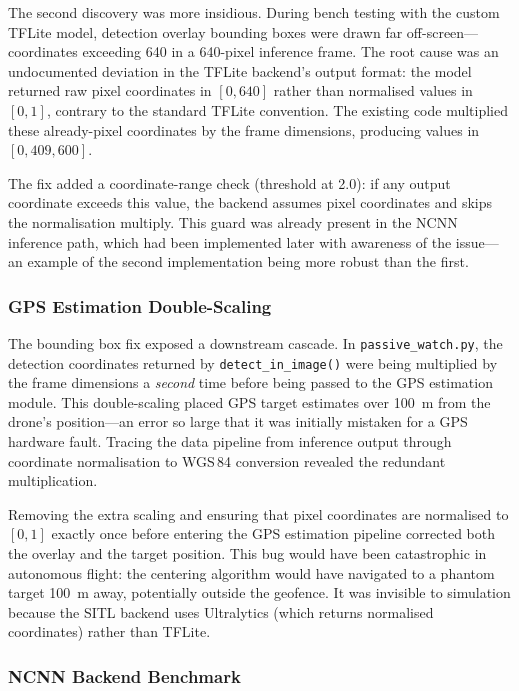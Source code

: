 The second discovery was more insidious.  During bench testing with the custom TFLite model, detection overlay bounding boxes were drawn far off-screen---coordinates exceeding 640 in a 640-pixel inference frame.  The root cause was an undocumented deviation in the TFLite backend's output format: the model returned raw pixel coordinates in $[0, 640]$ rather than normalised values in $[0, 1]$, contrary to the standard TFLite convention.  The existing code multiplied these already-pixel coordinates by the frame dimensions, producing values in $[0, 409{,}600]$.

The fix added a coordinate-range check (threshold at 2.0): if any output coordinate exceeds this value, the backend assumes pixel coordinates and skips the normalisation multiply.  This guard was already present in the NCNN inference path, which had been implemented later with awareness of the issue---an example of the second implementation being more robust than the first.

\subsubsection{GPS Estimation Double-Scaling}\label{sec:field-double}

The bounding box fix exposed a downstream cascade.  In \texttt{passive\_watch.py}, the detection coordinates returned by \texttt{detect\_in\_image()} were being multiplied by the frame dimensions a \emph{second} time before being passed to the GPS estimation module.  This double-scaling placed GPS target estimates over \SI{100}{\metre} from the drone's position---an error so large that it was initially mistaken for a GPS hardware fault.  Tracing the data pipeline from inference output through coordinate normalisation to WGS\,84 conversion revealed the redundant multiplication.

Removing the extra scaling and ensuring that pixel coordinates are normalised to $[0, 1]$ exactly once before entering the GPS estimation pipeline corrected both the overlay and the target position.  This bug would have been catastrophic in autonomous flight: the centering algorithm would have navigated to a phantom target \SI{100}{\metre} away, potentially outside the geofence.  It was invisible to simulation because the SITL backend uses Ultralytics (which returns normalised coordinates) rather than TFLite.

\subsubsection{NCNN Backend Benchmark}\label{sec:field-ncnn}


